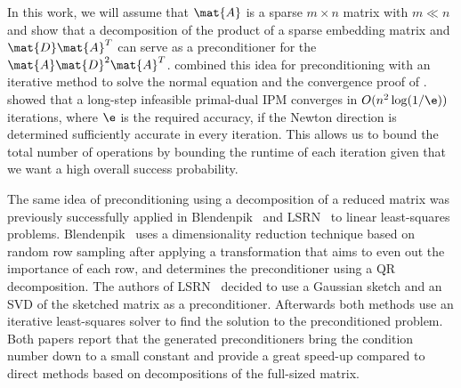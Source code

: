 In this work, we will assume that \(\mat{A}\) is a sparse \(m \times n\) matrix with \(m \ll n\) and show that a decomposition of the product of a sparse embedding matrix and \(\mat{D}\mat{A}^T\) can serve as a preconditioner for the \(\mat{A}\mat{D}^2\mat{A}^T\).
\Textcite{Avron-FasterRandomizedInfeasibleIPMs} combined this idea for preconditioning with an iterative method to solve the normal equation and the convergence proof of \textcite{Monteiro-ConvergenceAnalysisLongStepInfeasibleIPMs}.
\Textcite{Monteiro-ConvergenceAnalysisLongStepInfeasibleIPMs} showed that a long-step infeasible primal-dual IPM converges in \(O(n^2 \log(1/\e))\) iterations, where \(\e\) is the required accuracy, if the Newton direction is determined sufficiently accurate in every iteration.
This allows us to bound the total number of operations by bounding the runtime of each iteration given that we want a high overall success probability.

The same idea of preconditioning using a decomposition of a reduced matrix was previously successfully applied in Blendenpik~\cite{Avron-Blendenpik} and LSRN~\cite{MengSaundersMahoney-LSRN} to linear least-squares problems.
Blendenpik~\cite{Avron-Blendenpik} uses a dimensionality reduction technique based on random row sampling after applying a transformation that aims to even out the importance of each row, and determines the preconditioner using a QR decomposition.
The authors of LSRN~\cite{MengSaundersMahoney-LSRN} decided to use a Gaussian sketch and an SVD of the sketched matrix as a preconditioner.
Afterwards both methods use an iterative least-squares solver to find the solution to the preconditioned problem.
Both papers report that the generated preconditioners bring the condition number down to a small constant and provide a great speed-up compared to direct methods based on decompositions of the full-sized matrix.


